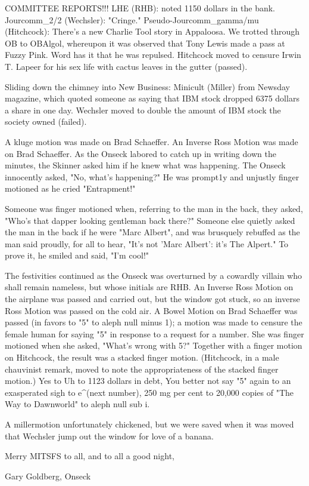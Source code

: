 \documentclass[12pt]{article}
\begin{document}
COMMITTEE REPORTS!!! LHE (RHB): noted 1150 dollars in the bank. Jourcomm_2/2 (Wechsler): "Cringe." Pseudo-Jourcomm_gamma/mu (Hitchcock): There's a new Charlie Tool story in Appaloosa. We trotted through OB to OBAlgol, whereupon it was observed that Tony Lewis made a pass at Fuzzy Pink. Word has it that he was repulsed. Hitchcock moved to censure Irwin T. Lapeer for his sex life with cactus leaves in the gutter (passed).

Sliding down the chimney into New Business: Minicult (Miller) from Newsday magazine, which quoted someone as saying that IBM stock dropped 6375 dollars a share in one day. Wechsler moved to double the amount of IBM stock the society owned (failed).

A kluge motion was made on Brad Schaeffer. An Inverse Ross Motion was made on Brad Schaeffer. As the Onseck labored to catch up in writing down the minutes, the Skinner asked him if he knew what was happening. The Onseck innocently asked, "No, what's happening?" He was prompt1y and unjustly finger motioned as he cried "Entrapment!"

Someone was finger motioned when, referring to the man in the back, they asked, "Who's that dapper looking gentleman back there?" Someone else quietly asked the man in the back if he were "Marc Albert", and was brusquely rebuffed as the man said proudly, for all to hear, "It's not 'Marc Albert': it's The Alpert." To prove it, he smiled and said, "I'm cool!"

The festivities continued as the Onseck was overturned by a cowardly villain who shall remain nameless, but whose initials are RHB. An Inverse Ross Motion on the airplane was passed and carried out, but the window got stuck, so an inverse Ross Motion was passed on the cold air. A Bowel Motion on Brad Schaeffer was passed (in favors to "5" to aleph null minus 1); a motion was made to censure the female human for saying "5" in response to a request for a number. She was finger motioned when she asked, "What's wrong with 5?" Together with a finger motion on Hitchcock, the result was a stacked finger motion. (Hitchcock, in a male chauvinist remark, moved to note the appropriateness of the stacked finger motion.) Yes to Uh to 1123 dollars in debt, You better not say "5" again to an exasperated sigh to e^(next number), 250 mg per cent to 20,000 copies of "The Way to Dawnworld" to aleph null sub i.

A millermotion unfortunately chickened, but we were saved when it was moved that Wechsler jump out the window for love of a banana.

\vspace{12pt}

\centerline{Merry MITSFS to all, and to all a good night,}
\centerline{Gary Goldberg, Onseck}
\end{document}
